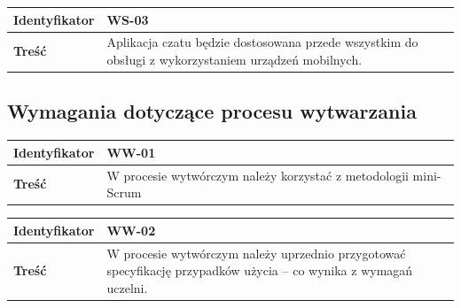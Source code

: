 \vspace{1em}

\begin{tabular}{ | l | l | }
	\hline
		\textbf{Identyfikator} &
	WS-03
		\\

	\hline
		\textbf{Treść} & \parbox[t]{13cm}{
			Aplikacja czatu będzie dostosowana przede wszystkim
			do obsługi z wykorzystaniem urządzeń mobilnych.
		}\\

	\hline
\end{tabular}

\subsection{Wymagania dotyczące procesu wytwarzania}

\leavevmode\hbox{}

\begin{tabular}{ | l | l | }
	\hline
		\textbf{Identyfikator} &
	WW-01
		\\

	\hline
		\textbf{Treść} & \parbox[t]{13cm}{
			W procesie wytwórczym należy korzystać z metodologii
			mini-Scrum
		}\\

	\hline
\end{tabular}

\vspace{1em}

\begin{tabular}{ | l | l | }
	\hline
		\textbf{Identyfikator} &
	WW-02
		\\

	\hline
		\textbf{Treść} & \parbox[t]{13cm}{
			W procesie wytwórczym należy uprzednio przygotować specyfikację przypadków użycia -- co wynika z wymagań uczelni.
		}\\

	\hline
\end{tabular}
